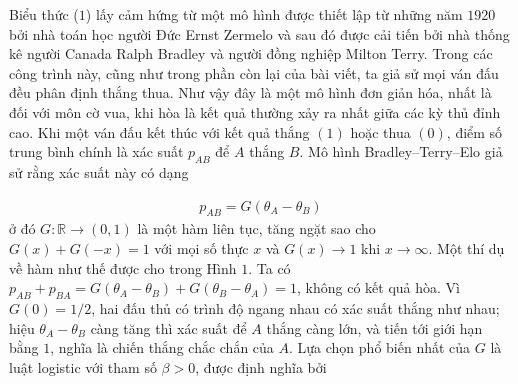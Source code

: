 \begin{multicols}{2}
	\vskip 0.02cm
	Biểu thức ($1$) lấy cảm hứng từ một mô hình được thiết lập từ những năm $1920$ bởi nhà toán học người Đức Ernst Zermelo và sau đó được cải tiến bởi nhà thống kê người Canada Ralph Bradley và người đồng nghiệp Milton Terry. Trong các công trình này, cũng như trong phần còn lại của bài viết, ta giả sử mọi ván đấu đều phân định thắng thua. Như vậy đây là một mô hình đơn giản hóa, nhất là đối với môn cờ vua, khi hòa là kết quả thường xảy ra nhất giữa các kỳ thủ đỉnh cao.
	\vskip 0.02cm
	Khi một ván đấu kết thúc với kết quả thắng $(1)$ hoặc thua $(0)$, điểm số trung bình chính là xác suất $p_{AB}$ để $A$ thắng $B$. Mô hình Bradley--Terry--Elo giả sử rằng xác suất này có dạng
	
	\vspace{-15pt}
	\begin{align*}
		p_{AB} = G(\theta_A - \theta_B)\tag{$2$}
	\end{align*}
	ở đó $G: \mathbb R \rightarrow (0, 1)$ là một hàm liên tục, tăng ngặt sao cho $G(x) + G(-x) = 1$ với mọi số thực $x$ và $G(x) \rightarrow 1$ khi $x \rightarrow \infty$. Một thí dụ về hàm như thế được cho trong Hình $1$. Ta có $p_{AB} + p_{BA} = G(\theta_A - \theta_B) + G(\theta_B - \theta_A) = 1$, không có kết quả hòa. Vì $G(0) = 1/2$, hai đấu thủ có trình độ ngang nhau có xác suất thắng như nhau; hiệu $\theta_A - \theta_B$ càng tăng thì xác suất để $A$ thắng càng lớn, và tiến tới giới hạn bằng $1$, nghĩa là chiến thắng chắc chắn của $A$.
	Lựa chọn phổ biến nhất của $G$ là luật logistic với tham số $\beta > 0$, được định nghĩa bởi
	

\end{multicols}

